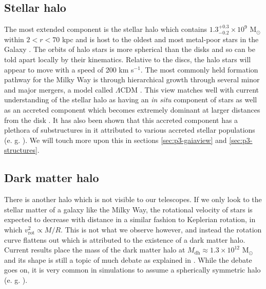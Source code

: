 \subsection{Stellar halo}\label{subsec:components-stellarhalo}
The most extended component is the stellar halo which contains $1.3^{+0.3}_{-0.2} \times 10^9$ M$_\odot$ within $2 < r < 70$ kpc \citep{mackereth:20} and is host to the oldest and most metal-poor stars in the Galaxy \citep{dacosta:19, horta:22}. The orbits of halo stars is more spherical than the disks and so can be told apart locally by their kinematics. Relative to the discs, the halo stars will appear to move with a speed of 200 km s$^{-1}$. The most commonly held formation pathway for the Milky Way is through hierarchical growth through several minor and major mergers, a model called $\Lambda$CDM \citep{springel:05}. This view matches well with current understanding of the stellar halo as having an \textit{in situ} component of stars as well as an accreted component which becomes extremely dominant at larger distances from the disk \citep{naidu:20}. It has also been shown that this accreted component has a plethora of substructures in it attributed to various accreted stellar populations (e. g. \citealt{koppelman:19, feuillet:21, dodd:22}). We will touch more upon this in sections \ref{sec:p3-gaiaview} and \ref{sec:p3-structures}.

\subsection{Dark matter halo}\label{subsec:components-darkhalo}
There is another halo which is not visible to our telescopes. If we only look to the stellar matter of a galaxy like the Milky Way, the rotational velocity of stars is expected to decrease with distance in a similar fashion to Keplerian rotation, in which $v_\mathrm{rot}^2 \propto M/R$. This is not what we observe however, and instead the rotation curve flattens out which is attributed to the existence of a dark matter halo. Current results place the mass of the dark matter halo at $M_\mathrm{dh} \approx 1.3 \times 10^12$ M$_\odot$ \cite{posti:19} and its shape is still a topic of much debate as explained in \cite{mcmillan:17}. While the debate goes on, it is very common in simulations to assume a spherically symmetric halo (e. g. \citealt{andersson:20}).


